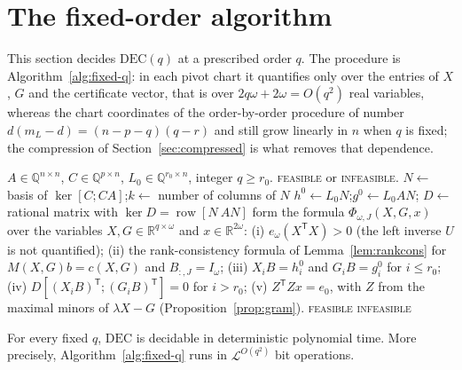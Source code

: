 \section{The fixed-order algorithm}\label{sec:fixedq}

This section decides $\mathrm{DEC}(q)$ at a prescribed order $q$. The procedure
is Algorithm~\ref{alg:fixed-q}: in each pivot chart it quantifies only over the
entries of $X$, $G$ and the certificate vector, that is over
$2q\omega+2\omega=O(q^2)$ real variables, whereas the chart coordinates of the
order-by-order procedure of \cite{fer26b} number $d(m_L-d)=(n-p-q)(q-r)$ and
still grow linearly in $n$ when $q$ is fixed; the compression of
Section~\ref{sec:compressed} is what removes that dependence.

\begin{algorithm}[!t]
\caption{Deciding $\mathrm{DEC}(q)$ for a fixed order $q$}
\label{alg:fixed-q}
\begin{algorithmic}[1]
\Require $A\in\mathbb Q^{n\times n}$, $C\in\mathbb Q^{p\times n}$,
$L_0\in\mathbb Q^{r_0\times n}$, integer $q\ge r_0$.
\Ensure \textsc{feasible} or \textsc{infeasible}.
\State $N\gets$ basis of $\ker[C;CA]$;\quad $k\gets$ number of columns of $N$
\State $h^0\gets L_0N$;\quad $g^0\gets L_0AN$;\quad
$D\gets$ rational matrix with $\ker D=\operatorname{row}[N\ AN]$
    \State form the formula $\Phi_{\omega,J}(X,G,x)$ over the variables
           $X,G\in\mathbb R^{q\times\omega}$ and $x\in\mathbb R^{2\omega}$:
    \Statex \quad (i) $e_\omega(X^{\mathsf T}X)>0$ (the left inverse $U$ is
           not quantified);
    \Statex \quad (ii) the rank-consistency formula of
           Lemma~\ref{lem:rankcons} for $M(X,G)b=c(X,G)$ and $B_{:,J}=I_\omega$;
    \Statex \quad (iii) $X_iB=h_i^0$ and $G_iB=g_i^0$ for $i\le r_0$;
    \Statex \quad (iv) $D[(X_iB)^{\mathsf T};(G_iB)^{\mathsf T}]=0$ for
           $i>r_0$;
    \Statex \quad (v) $Z^{\mathsf T}Zx=e_0$, with $Z$ from the maximal minors
           of $\lambda X-G$ (Proposition~\ref{prop:gram}).
      \State \Return \textsc{feasible}
    \EndIf
  \EndFor
\EndFor
\State \Return \textsc{infeasible}
\end{algorithmic}
\end{algorithm}

\begin{thm}\label{thm:fixedq}
For every fixed $q$, $\mathrm{DEC}$ is decidable in deterministic polynomial
time. More precisely, Algorithm~\ref{alg:fixed-q} runs in
$\mathcal L^{O(q^2)}$ bit operations.
\end{thm}

